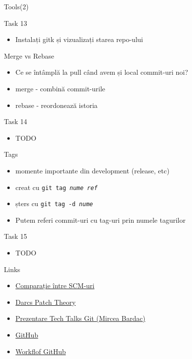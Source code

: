 \documentclass{beamer}
\begin{document}
\begin{frame}{Tools(2)}
  \begin{alertblock}{Task 13}
    \begin{itemize}
      \item Instalați gitk și vizualizați starea repo-ului
    \end{itemize}
  \end{alertblock}
\end{frame}

\begin{frame}{Merge vs Rebase}
  \begin{itemize}
    \item Ce se întâmplă la pull când avem și local commit-uri noi?
    \pause
    \item merge - combină commit-urile
    \item rebase - reordonează istoria
  \end{itemize}
  \pause
  \begin{alertblock}{Task 14}
    \begin{itemize}
      \item TODO
    \end{itemize}
  \end{alertblock}
\end{frame}

\begin{frame}{Tags}
  \begin{itemize}
    \item momente importante din development (release, etc)
    \item creat cu \texttt{git tag \textit{nume} \textit{ref}}
    \item șters cu \texttt{git tag -d \textit{nume}}
    \item Putem referi commit-uri cu tag-uri prin numele tagurilor
  \end{itemize}
  \pause
  \begin{alertblock}{Task 15}
    \begin{itemize}
      \item TODO
    \end{itemize}
  \end{alertblock}
\end{frame}

\begin{frame}[label=l]{Links}
  \begin{itemize}
    \item \href{http://en.wikipedia.org/wiki/Comparison_of_revision_control_software}{Comparație între SCM-uri}
    \item \href{http://en.wikibooks.org/wiki/Understanding_Darcs/Patch_theory}{Darcs Patch Theory}
    \item \href{http://talks.rosedu.org/prezentari/prezentarea03}{Prezentare
    Tech Talks Git (Mircea Bardac)}
    \item \href{http://github.com}{GitHub}
    \item
    \href{http://www.eqqon.com/index.php/Collaborative_Github_Workflow}{Workflof
    GitHub}
  \end{itemize}
\end{frame}
\end{document}
